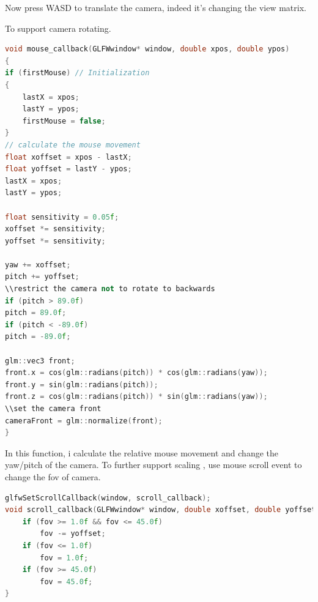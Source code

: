 \documentclass[acmtog]{acmart}
\begin{document}
\par Now press WASD to translate the camera, indeed it's changing the view matrix.
\par To support camera rotating. 
\begin{lstlisting}[frame=single,breaklines=true,language=c++,basicstyle=\footnotesize\ttfamily]
void mouse_callback(GLFWwindow* window, double xpos, double ypos)
{
if (firstMouse) // Initialization 
{
	lastX = xpos;
	lastY = ypos;
	firstMouse = false;
}
// calculate the mouse movement
float xoffset = xpos - lastX;
float yoffset = lastY - ypos; 
lastX = xpos;
lastY = ypos;

float sensitivity = 0.05f;
xoffset *= sensitivity;
yoffset *= sensitivity;

yaw += xoffset;
pitch += yoffset;
\\restrict the camera not to rotate to backwards
if (pitch > 89.0f)
pitch = 89.0f;
if (pitch < -89.0f)
pitch = -89.0f;

glm::vec3 front;
front.x = cos(glm::radians(pitch)) * cos(glm::radians(yaw));
front.y = sin(glm::radians(pitch));
front.z = cos(glm::radians(pitch)) * sin(glm::radians(yaw));
\\set the camera front
cameraFront = glm::normalize(front);
}
\end{lstlisting}
In this function, i calculate the relative mouse movement  and change the yaw/pitch of the camera. 
To further support scaling , use mouse scroll event to change the fov of camera.
\begin{lstlisting}[frame=single,breaklines=true,language=c++,basicstyle=\footnotesize\ttfamily]
glfwSetScrollCallback(window, scroll_callback);
void scroll_callback(GLFWwindow* window, double xoffset, double yoffset) {
	if (fov >= 1.0f && fov <= 45.0f)
		fov -= yoffset;
	if (fov <= 1.0f)
		fov = 1.0f;
	if (fov >= 45.0f)
		fov = 45.0f;
}
\end{lstlisting}
\end{document}
